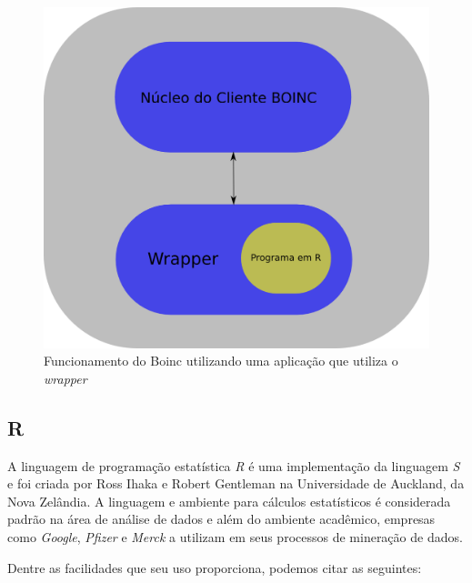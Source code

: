 \begin{figure}[!h]
  \centering
  \includegraphics[scale=0.3]{boinc-wrap.png}
  \caption{Funcionamento do Boinc utilizando uma aplicação que utiliza o \emph{wrapper}}
  \label{boinc-wrap}
\end{figure}


\subsection{R}

A linguagem de programação estatística \emph{R} é uma implementação da linguagem \emph{S} e foi criada por Ross Ihaka e Robert
Gentleman na Universidade de Auckland, da Nova Zelândia. A linguagem e ambiente para cálculos estatísticos é considerada
padrão %
na área de análise de dados e além do ambiente acadêmico, empresas como \emph{Google}, \emph{Pfizer} e \emph{Merck} a utilizam em seus
processos de mineração de dados. 

Dentre as facilidades que seu uso proporciona, podemos citar as seguintes:

